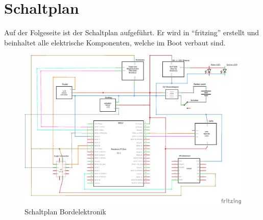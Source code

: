 \chapter{Schaltplan}
\label{appendix:schaltplan}
Auf der Folgeseite ist der Schaltplan aufgeführt. Er wird in \enquote{fritzing} erstellt und beinhaltet alle elektrische Komponenten, welche im Boot verbaut sind.

\begin{figure}[H]
    \centering
    \includegraphics[angle=90,width=\textwidth,height=\textheight,keepaspectratio]{assets/Boat Electronics3_Schaltplanfinal.png}
    \caption{Schaltplan Bordelektronik}
\end{figure}
